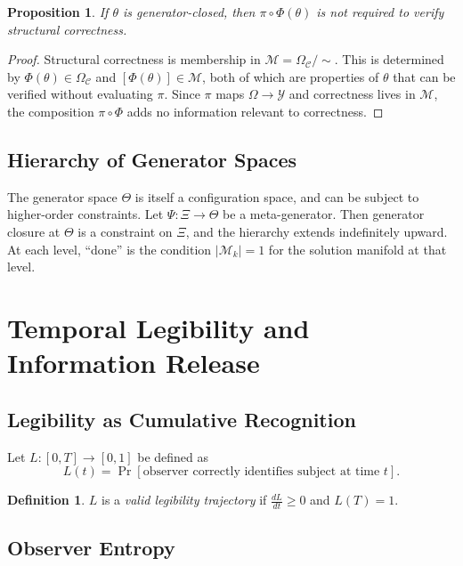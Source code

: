 \documentclass[11pt, twoside]{article}
\theoremstyle{plain}
\newtheorem{proposition}[theorem]{Proposition}
\theoremstyle{definition}
\newtheorem{definition}[theorem]{Definition}
\theoremstyle{remark}
\newcommand{\OmC}{\Omega_{\mathcal{C}}}
\begin{document}
\begin{proposition}
If $\theta$ is generator-closed, then $\pi \circ \Phi(\theta)$ is not required to verify structural correctness.
\end{proposition}

\begin{proof}
Structural correctness is membership in $\mathcal{M} = \OmC / {\sim}$. This is determined by $\Phi(\theta) \in \OmC$ and $[\Phi(\theta)] \in \mathcal{M}$, both of which are properties of $\theta$ that can be verified without evaluating $\pi$. Since $\pi$ maps $\Omega \to \mathcal{Y}$ and correctness lives in $\mathcal{M}$, the composition $\pi \circ \Phi$ adds no information relevant to correctness.
\end{proof}

\subsection{Hierarchy of Generator Spaces}

The generator space $\Theta$ is itself a configuration space, and can be subject to higher-order constraints. Let $\Psi : \Xi \to \Theta$ be a meta-generator. Then generator closure at $\Theta$ is a constraint on $\Xi$, and the hierarchy extends indefinitely upward. At each level, ``done'' is the condition $|\mathcal{M}_k| = 1$ for the solution manifold at that level.

\section{Temporal Legibility and Information Release}
\label{app:legibility}

\subsection{Legibility as Cumulative Recognition}

Let $L : [0, T] \to [0, 1]$ be defined as
\[
L(t) = \Pr[\text{observer correctly identifies subject at time } t].
\]

\begin{definition}
$L$ is a \emph{valid legibility trajectory} if $\frac{dL}{dt} \geq 0$ and $L(T) = 1$.
\end{definition}

\subsection{Observer Entropy}
\end{document}
